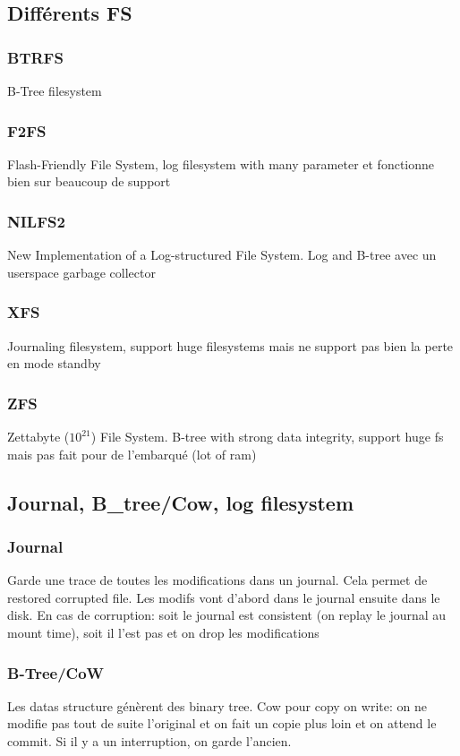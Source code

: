\subsection{Différents FS}
\subsubsection{BTRFS}
B-Tree filesystem
\subsubsection{F2FS}
Flash-Friendly File System, log filesystem with many parameter et fonctionne bien sur beaucoup de support
\subsubsection{NILFS2}
New Implementation of a Log-structured File System. Log and B-tree avec un userspace garbage collector
\subsubsection{XFS}
Journaling filesystem, support huge filesystems mais ne support pas bien la perte en mode standby
\subsubsection{ZFS}
Zettabyte ($10^21$) File System. B-tree with strong data integrity, support huge fs mais pas fait pour de l'embarqué (lot of ram)
\subsection{Journal, B\_tree/Cow, log filesystem}
\subsubsection{Journal}
Garde une trace de toutes les modifications dans un journal. Cela permet de restored corrupted file. Les modifs vont d'abord dans le journal ensuite dans le disk. En cas de corruption: soit le journal est consistent (on replay le journal au mount time), soit il l'est pas et on drop les modifications
\subsubsection{B-Tree/CoW}
Les datas structure génèrent des binary tree. Cow pour copy on write: on ne modifie pas tout de suite l'original et on fait un copie plus loin et on attend le commit. Si il y a un interruption, on garde l'ancien.
